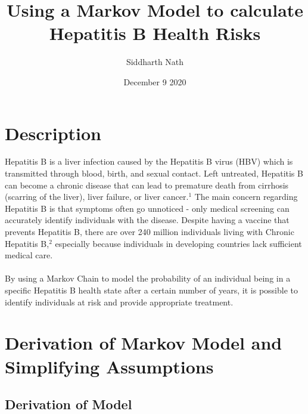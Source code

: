 \documentclass{article}
\title{\LARGE Using a Markov Model to calculate Hepatitis B Health Risks}
\author{\Large Siddharth Nath}
\date{\Large December 9 2020}
\begin{document}


\maketitle
\newpage

\tableofcontents
\newpage

\section{Description}

Hepatitis B is a liver infection caused by the Hepatitis B virus (HBV) which is transmitted through blood, birth, and sexual contact. Left untreated, Hepatitis B can become a chronic disease that can lead to premature death from cirrhosis (scarring of the liver), liver failure, or liver cancer.$^1$ The main concern regarding Hepatitis B is that symptoms often go unnoticed - only medical screening can accurately identify individuals with the disease. Despite having a vaccine that prevents Hepatitis B, there are over 240 million individuals living with Chronic Hepatitis B,$^2$ especially because individuals in developing countries lack sufficient medical care.
\\ 
\\
By using a Markov Chain to model the probability of an individual being in a specific Hepatitis B health state after a certain number of years, it is possible to identify individuals at risk and provide appropriate treatment. 

\section{Derivation of Markov Model and Simplifying Assumptions}

\subsection{Derivation of Model }
\end{document}
